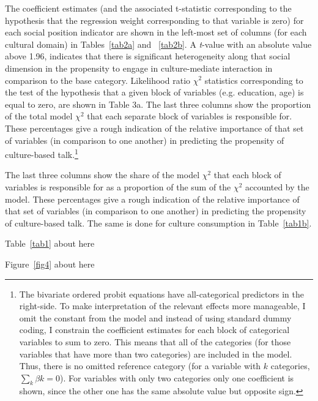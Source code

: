 \documentclass[11pt]{article}
\begin{document}
The coefficient estimates (and the associated t-statistic corresponding to the hypothesis that the regression weight corresponding to that variable is zero) for each social position indicator are shown in the left-most set of columns (for each cultural domain) in Tables~\ref{tab2a} and ~\ref{tab2b}.  A \emph{t}-value with an absolute value above 1.96, indicates that there is significant heterogeneity along that social dimension in the propensity to engage in culture-mediate interaction in comparison to the base category. Likelihood ratio $\chi^{2}$ statistics corresponding to the test of the hypothesis that a given block of variables (e.g. education, age) is equal to zero, are shown in Table 3a. The last three columns show the proportion of the total model $\chi^{2}$ that each separate block of variables is responsible for.  These percentages give a rough indication of the relative importance of that set of variables (in comparison to one another) in predicting the propensity of culture-based talk.\footnote{The bivariate ordered probit equations have all-categorical predictors in the right-side.  To make interpretation of the relevant effects more manageable, I omit the constant from the model and instead of using standard dummy coding, I constrain the coefficient estimates for each block of categorical variables to sum to zero.  This means that all of the categories (for those variables that have more than two categories) are included in the model.  Thus, there is no omitted reference category  (for a variable with $k$ categories, $\sum_{k}\beta{k}=0$). For variables with only two categories only one coefficient is shown, since the other one has the same absolute value but opposite sign.}

The last three columns show the share of the model $\chi^{2}$ that each block of variables is responsible for as a proportion of the sum of the $\chi^{2}$ accounted by the model.  These percentages give a rough indication of the relative importance of that set of variables (in comparison to one another) in predicting the propensity of culture-based talk. The same is done for culture consumption in Table~\ref{tab1b}.

\begin{center}
	Table~\ref{tab1} about here
\end{center}

\begin{center}
	Figure~\ref{fig4} about here
\end{center}
\end{document}
